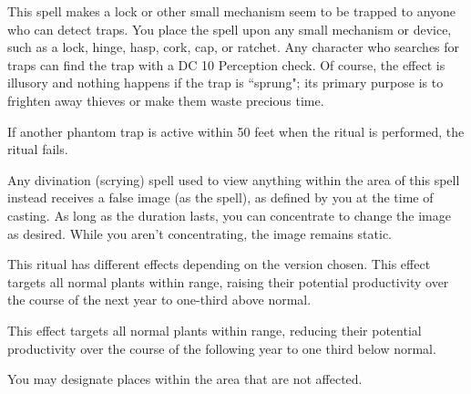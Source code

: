 \begin{spelleffect}
This spell makes a lock or other small mechanism seem to be trapped to anyone who can detect traps. You place the spell upon any small mechanism or device, such as a lock, hinge, hasp, cork, cap, or ratchet. Any character who searches for traps can find the trap with a DC 10 Perception check. Of course, the effect is illusory and nothing happens if the trap is ``sprung"; its primary purpose is to frighten away thieves or make them waste precious time.
\par If another phantom trap is active within 50 feet when the ritual is performed, the ritual fails.
\end{spelleffect}

\spellrng{\rngclose}
\begin{spelleffect}
Any divination (scrying) spell used to view anything within the area of this spell instead receives a false image (as the  spell), as defined by you at the time of casting. As long as the duration lasts, you can concentrate to change the image as desired. While you aren't concentrating, the image remains static.
\end{spelleffect}

\begin{spelleffect}
This ritual has different effects depending on the version chosen.
 This effect targets all normal plants within range, raising their potential productivity over the course of the next year to one-third above normal.
\par {} This effect targets all normal plants within range, reducing their potential productivity over the course of the following year to one third below normal.
\end{spelleffect}
\begin{spellnotes}
You may designate places within the area that are not affected.
\end{spellnotes}

